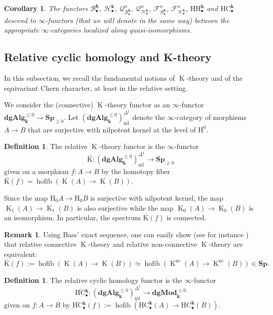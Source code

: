 \documentclass[JEP,XML,SOM,Unicode,NoEqCountersInSection]{cedram}
\let\mathcal\mathscr
\let\widebar\bar
\newcommand{\sbullet}{{\scriptscriptstyle\bullet}}
\newtheorem{cor}[thm]{Corollary}
\theoremstyle{definition}
\newtheorem{df}[thm]{Definition}
\newtheorem{rmq}[thm]{Remark}
\newcommand{\Bc}{\mathcal{B}}
\newcommand{\Qc}{\mathcal{Q}}
\newcommand{\Hc}{\mathcal{H}}
\newcommand{\Fc}{\mathcal{F}}
\newcommand{\Sp}{\mathbf{Sp}}
\newcommand{\dgAlg}{\mathbf{dgAlg}}
\newcommand{\dgMod}{\mathbf{dgMod}}
\DeclareMathOperator{\K}{K}
\newcommand{\homol}{\mathrm H}
\newcommand{\bK}{\widebar{\mathrm{K}}}
\newcommand{\HC}{\mathrm{HC}}
\newcommand{\HH}{\mathrm{HH}}
\newcommand{\bHC}{\widebar{\mathrm{HC}}{}}
\renewcommand{\k}{{\boldsymbol{k}}}
\newcommand{\hofib}{\operatorname{hofib}}
\begin{document}
\begin{cor}
The functors $\Bc_\sbullet^\k$, $\Hc_\sbullet^\k$, $\Qc_{\Bc_\sbullet^\k}^n$, $\Qc_{\Hc_\sbullet^\k}^n$, $\Fc_{\Bc_\sbullet^\k}^n$, $\Fc_{\Hc_\sbullet^\k}^n$, $\HH_\sbullet^\k$ and $\HC_\sbullet^\k$ descend to $\infty$-functors (that we will denote in the same way) between the appropriate $\infty$-categories localized along quasi-isomorphisms.
\end{cor}

\subsection{Relative cyclic homology and K-theory}\label{subsec:relK}
In this subsection, we recall the fundamental notions of $\K$-theory and of the equivariant Chern character, at least in the relative setting.

We consider the (connective) $\K$-theory functor as an $\infty$-functor $\dgAlg_\k^{\leq 0} \to \Sp_{\geq 0}$.
Let $(\dgAlg_\k^{\leq 0})^{\Delta^1}_\mathrm{nil}$ denote the $\infty$-category of morphisms $A \to B$ that are surjective with nilpotent kernel at the level of $\homol^0$.

\begin{df}
The relative $\K$-theory functor is the $\infty$-functor
\[
\bK \colon (\dgAlg_\k^{\leq 0})^{\Delta^1}_\mathrm{nil} \to \Sp_{\geq 0}
\]
given on a morphism $f \colon A \to B$ by the homotopy fiber $\bK(f) = \hofib(\K(A) \to \K(B))$.
\end{df}
Since the map $\homol_0A \to \homol_0B$ is surjective with nilpotent kernel, the map $\K_1(A) \to \K_1(B)$ is also surjective while the map $\K_0(A) \to \K_0(B)$ is an isomorphism. In particular, the spectrum $\bK(f)$ is connected.

\begin{rmq}\label{rmk:relKnc}
Using Bass' exact sequence, one can easily show (see for instance \cite[\S 2.8]{beilinson:relK}) that relative connective $\K$-theory and relative non-connective $\K$-theory are equivalent:
\[
\bK(f) := \hofib(\K(A) \to \K(B)) \simeq \hofib(\K^\mathrm{nc}(A) \to \K^\mathrm{nc}(B)) \in \Sp.
\]
\end{rmq}

\begin{df}
The relative cyclic homology functor is the $\infty$-functor
\[
\bHC_\sbullet^\k \colon (\dgAlg_\k^{\leq 0})^{\Delta^1}_\mathrm{nil} \to \dgMod_\k^{\leq 0}
\]
given on $f \colon A \to B$ by $\bHC_\sbullet^\k(f) := \hofib(\HC_\sbullet^\k(A) \to \HC_\sbullet^\k(B))$.
\end{df}
\end{document}
